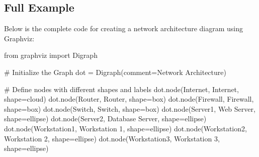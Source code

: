 \documentclass[
  letterpaper,
  DIV=11,
  numbers=noendperiod]{scrreprt}
\newenvironment{Shaded}{\begin{snugshade}}{\end{snugshade}}
\newcommand{\CommentTok}[1]{\textcolor[rgb]{0.37,0.37,0.37}{#1}}
\newcommand{\ImportTok}[1]{\textcolor[rgb]{0.00,0.46,0.62}{#1}}
\newcommand{\NormalTok}[1]{\textcolor[rgb]{0.00,0.23,0.31}{#1}}
\newcommand{\OperatorTok}[1]{\textcolor[rgb]{0.37,0.37,0.37}{#1}}
\newcommand{\StringTok}[1]{\textcolor[rgb]{0.13,0.47,0.30}{#1}}
\begin{document}
\subsection{Full Example}\label{full-example}

Below is the complete code for creating a network architecture diagram
using Graphviz:

\begin{Shaded}
\begin{Highlighting}[]
\ImportTok{from}\NormalTok{ graphviz }\ImportTok{import}\NormalTok{ Digraph}

\CommentTok{\# Initialize the Graph}
\NormalTok{dot }\OperatorTok{=}\NormalTok{ Digraph(comment}\OperatorTok{=}\StringTok{\textquotesingle{}Network Architecture\textquotesingle{}}\NormalTok{)}

\CommentTok{\# Define nodes with different shapes and labels}
\NormalTok{dot.node(}\StringTok{\textquotesingle{}Internet\textquotesingle{}}\NormalTok{, }\StringTok{\textquotesingle{}Internet\textquotesingle{}}\NormalTok{, shape}\OperatorTok{=}\StringTok{\textquotesingle{}cloud\textquotesingle{}}\NormalTok{)}
\NormalTok{dot.node(}\StringTok{\textquotesingle{}Router\textquotesingle{}}\NormalTok{, }\StringTok{\textquotesingle{}Router\textquotesingle{}}\NormalTok{, shape}\OperatorTok{=}\StringTok{\textquotesingle{}box\textquotesingle{}}\NormalTok{)}
\NormalTok{dot.node(}\StringTok{\textquotesingle{}Firewall\textquotesingle{}}\NormalTok{, }\StringTok{\textquotesingle{}Firewall\textquotesingle{}}\NormalTok{, shape}\OperatorTok{=}\StringTok{\textquotesingle{}box\textquotesingle{}}\NormalTok{)}
\NormalTok{dot.node(}\StringTok{\textquotesingle{}Switch\textquotesingle{}}\NormalTok{, }\StringTok{\textquotesingle{}Switch\textquotesingle{}}\NormalTok{, shape}\OperatorTok{=}\StringTok{\textquotesingle{}box\textquotesingle{}}\NormalTok{)}
\NormalTok{dot.node(}\StringTok{\textquotesingle{}Server1\textquotesingle{}}\NormalTok{, }\StringTok{\textquotesingle{}Web Server\textquotesingle{}}\NormalTok{, shape}\OperatorTok{=}\StringTok{\textquotesingle{}ellipse\textquotesingle{}}\NormalTok{)}
\NormalTok{dot.node(}\StringTok{\textquotesingle{}Server2\textquotesingle{}}\NormalTok{, }\StringTok{\textquotesingle{}Database Server\textquotesingle{}}\NormalTok{, shape}\OperatorTok{=}\StringTok{\textquotesingle{}ellipse\textquotesingle{}}\NormalTok{)}
\NormalTok{dot.node(}\StringTok{\textquotesingle{}Workstation1\textquotesingle{}}\NormalTok{, }\StringTok{\textquotesingle{}Workstation 1\textquotesingle{}}\NormalTok{, shape}\OperatorTok{=}\StringTok{\textquotesingle{}ellipse\textquotesingle{}}\NormalTok{)}
\NormalTok{dot.node(}\StringTok{\textquotesingle{}Workstation2\textquotesingle{}}\NormalTok{, }\StringTok{\textquotesingle{}Workstation 2\textquotesingle{}}\NormalTok{, shape}\OperatorTok{=}\StringTok{\textquotesingle{}ellipse\textquotesingle{}}\NormalTok{)}
\NormalTok{dot.node(}\StringTok{\textquotesingle{}Workstation3\textquotesingle{}}\NormalTok{, }\StringTok{\textquotesingle{}Workstation 3\textquotesingle{}}\NormalTok{, shape}\OperatorTok{=}\StringTok{\textquotesingle{}ellipse\textquotesingle{}}\NormalTok{)}


\end{Highlighting}
\end{Shaded}
\end{document}
